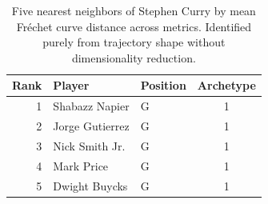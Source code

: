 \begin{table}[htbp]
  \centering\small
  \begin{tabular}{rllc}
    \toprule
    Rank & Player & Position & Archetype \\
    \midrule
    1 & Shabazz Napier & G & 1 \\
    2 & Jorge Gutierrez & G & 1 \\
    3 & Nick Smith Jr. & G & 1 \\
    4 & Mark Price & G & 1 \\
    5 & Dwight Buycks & G & 1 \\
    \bottomrule
  \end{tabular}
  \caption{Five nearest neighbors of Stephen Curry by mean Fr\'{e}chet curve distance across metrics. Identified purely from trajectory shape without dimensionality reduction.}
  \label{tab:Stephen_Curry_frechet_curve_neighbors}
\end{table}

